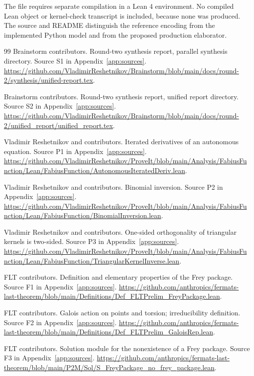 \documentclass[11pt,a4paper]{article}
\theoremstyle{plain}
\theoremstyle{definition}
\begin{document}
The  file requires separate compilation in a Lean 4 environment. No compiled Lean object or kernel-check transcript is included, because none was produced. The source and README distinguish the reference encoding from the implemented Python model and from the proposed production elaborator.

\clearpage
\begin{thebibliography}{99}
\small
{} Brainstorm contributors. Round-two synthesis report, parallel synthesis directory. Source S1 in Appendix~\ref{app:sources}. \url{https://github.com/VladimirReshetnikov/Brainstorm/blob/main/docs/round-2/synthesis/unified-report.tex}.

 Brainstorm contributors. Round-two synthesis report, unified report directory. Source S2 in Appendix~\ref{app:sources}. \url{https://github.com/VladimirReshetnikov/Brainstorm/blob/main/docs/round-2/unified_report/unified_report.tex}.

 Vladimir Reshetnikov and contributors. Iterated derivatives of an autonomous equation. Source P1 in Appendix~\ref{app:sources}. \url{https://github.com/VladimirReshetnikov/ProveIt/blob/main/Analysis/FabiusFunction/Lean/FabiusFunction/AutonomousIteratedDeriv.lean}.

 Vladimir Reshetnikov and contributors. Binomial inversion. Source P2 in Appendix~\ref{app:sources}. \url{https://github.com/VladimirReshetnikov/ProveIt/blob/main/Analysis/FabiusFunction/Lean/FabiusFunction/BinomialInversion.lean}.

 Vladimir Reshetnikov and contributors. One-sided orthogonality of triangular kernels is two-sided. Source P3 in Appendix~\ref{app:sources}. \url{https://github.com/VladimirReshetnikov/ProveIt/blob/main/Analysis/FabiusFunction/Lean/FabiusFunction/TriangularKernelInverse.lean}.

 FLT contributors. Definition and elementary properties of the Frey package. Source F1 in Appendix~\ref{app:sources}. \url{https://github.com/anthropics/fermats-last-theorem/blob/main/Definitions/Def_FLTPrelim_FreyPackage.lean}.

 FLT contributors. Galois action on points and torsion; irreducibility definition. Source F2 in Appendix~\ref{app:sources}. \url{https://github.com/anthropics/fermats-last-theorem/blob/main/Definitions/Def_FLTPrelim_GaloisRep.lean}.

 FLT contributors. Solution module for the nonexistence of a Frey package. Source F3 in Appendix~\ref{app:sources}. \url{https://github.com/anthropics/fermats-last-theorem/blob/main/P2M/Sol/S_FreyPackage_no_frey_package.lean}.


\end{thebibliography}
\end{document}
